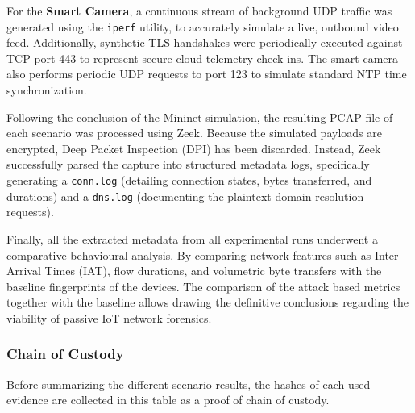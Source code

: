 For the \textbf{Smart Camera}, a continuous stream of background UDP traffic was generated using the \texttt{iperf} utility, to accurately simulate a live, outbound video feed. Additionally, synthetic TLS handshakes were periodically executed against TCP port 443 to represent secure cloud telemetry check-ins. The smart camera also performs periodic UDP requests to port 123 to simulate standard NTP time synchronization. 

Following the conclusion of the Mininet simulation, the resulting PCAP file of each scenario was processed using Zeek. Because the simulated payloads are encrypted, Deep Packet Inspection (DPI) has been discarded. Instead, Zeek successfully parsed the capture into structured metadata logs, specifically generating a \texttt{conn.log} (detailing connection states, bytes transferred, and durations) and a \texttt{dns.log} (documenting the plaintext domain resolution requests).

Finally, all the extracted metadata from all experimental runs underwent a comparative behavioural analysis. By comparing network features such as Inter Arrival Times (IAT), flow durations, and volumetric byte transfers with the baseline fingerprints of the devices. The comparison of the attack based metrics together with the baseline allows drawing the definitive conclusions regarding the viability of passive IoT network forensics. 

\subsubsection{Chain of Custody}
Before summarizing the different scenario results, the hashes of each used evidence are collected in this table as a proof of chain of custody.

